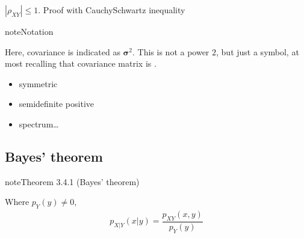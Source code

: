 \documentclass[letterpaper,10pt,english]{jupyterBook}
\begin{document}
\sphinxAtStartPar
{} \(|\rho_{XY}| \le 1\). Proof with Cauchy\sphinxhyphen{}Schwartz inequality 

\begin{sphinxadmonition}{note}{Notation}

\sphinxAtStartPar
Here, covariance is indicated as \(\boldsymbol{\sigma}^2\). This is not a power \(2\), but just a symbol, at most recalling that covariance matrix is .
\end{sphinxadmonition}

\sphinxAtStartPar
{}
\begin{itemize}
\item {} 
\sphinxAtStartPar
symmetric

\item {} 
\sphinxAtStartPar
semi\sphinxhyphen{}definite positive

\item {} 
\sphinxAtStartPar
spectrum…

\end{itemize}


\subsection{Bayes’ theorem}
\label{\detokenize{ch/prob/rv-multi-dimensional:bayes-theorem}}\label{\detokenize{ch/prob/rv-multi-dimensional:prob-multidim-bayes}}\label{ch/prob/rv-multi-dimensional:theorem-1}
\begin{sphinxadmonition}{note}{Theorem 3.4.1 (Bayes’ theorem)}



\sphinxAtStartPar
Where \(p_Y(y) \ne 0\),
\begin{equation*}
\begin{split}p_{X|Y}(x|y) = \dfrac{p_{XY}(x,y)}{p_Y(y)}\end{split}
\end{equation*}\end{sphinxadmonition}
\end{document}
